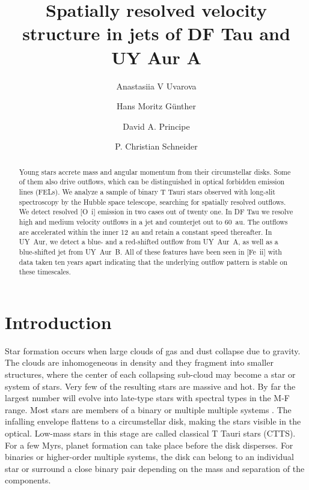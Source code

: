 \documentclass[twocolumn,trackchanges]{aastex63}
\begin{document}
\title{Spatially resolved velocity structure in jets of DF Tau and UY Aur A}



\author{Anastasiia V Uvarova}

\author[0000-0003-4243-2840]{Hans Moritz G\"unther}

\author{David A. Principe}

\author{P. Christian Schneider}

\begin{abstract}
Young stars accrete mass and angular momentum from their circumstellar
disks. Some of them also drive outflows, which can be distinguished in
optical forbidden emission lines (FELs). We analyze a sample of binary
T Tauri stars observed with long-slit spectroscopy by the Hubble space
telescope, searching for spatially resolved outflows. We detect resolved [O~{\sc i}] emission in two cases out of twenty one. In DF Tau we resolve high and medium velocity outflows in a jet and counterjet out to 60~au. The outflows are accelerated within the inner 12~au and retain a constant speed thereafter. In UY~Aur, we detect a blue- and a red-shifted outflow from UY~Aur~A, as well as a blue-shifted jet from UY~Aur~B. All of these features have been seen in [Fe~{\sc ii}] with data taken ten years apart indicating that the underlying outflow pattern is stable on these timescales.
\end{abstract}%


\section{Introduction}
\label{sect:intro}
Star formation occurs when large clouds of gas and dust collapse due to
gravity. The clouds are inhomogeneous in density and they fragment into
smaller structures, where the center of each collapsing sub-cloud may
become a star or system of stars. Very few of the resulting stars are
massive and hot. By far the largest number will evolve into late-type
stars with spectral types in the M-F range. Most stars are members of a binary or multiple multiple systems \citep[see e.g.\ review by][]{2007prpl.conf..379D}.
The infalling envelope
flattens to a circumstellar disk, making the stars visible in the
optical. Low-mass stars in this stage are called classical T Tauri stars
(CTTS). For a few Myrs, planet formation can take place before the disk
disperses. For binaries or higher-order multiple systems, the disk can
belong to an individual star or surround a close binary pair depending
on the mass and separation of the components.
\end{document}
